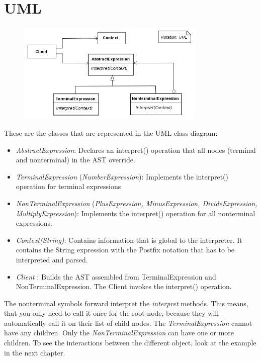 \chapter{UML}

\begin{figure}[H]
    \centering
        \includegraphics[width=0.8\textwidth]{figures/uml_class_diagram.png}
\end{figure}

These are the classes that are represented in the UML class diagram: 

\begin{itemize}
    \item \textit{AbstractExpression}: Declares an interpret() operation that all nodes (terminal and nonterminal) in the AST override.
    \item \textit{TerminalExpression} (\textit{NumberExpression}): Implements the interpret() operation for terminal expressions
    \item \textit{NonTerminalExpression} (\textit{PlusExpression, MinusExpression, DivideExpression, MultiplyExpression}): Implements the interpret() operation for all nonterminal expressions.
    \item \textit{Context(String)}: Contains information that is global to the interpreter. It contains the String expression with the Postfix notation that has to be interpreted and parsed.
    \item \textit{Client }: Builds the AST assembled from TerminalExpression and NonTerminalExpression. The Client invokes the interpret() operation.
\end{itemize}

The nonterminal symbols forward interpret the \textit{interpret} methods. This means, that you only need to call it once for the root node, because they will automatically call it on their list of child nodes. The \textit{TerminalExpression} cannot have any children. Only the \textit{NonTerminalExpression} can have one or more children. To see the interactions between the different object, look at the example in the next chapter.

